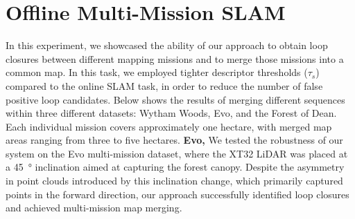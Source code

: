 \section{Offline Multi-Mission SLAM} 
\label{sec:offline_multi_mission}
In this experiment, we showcased the ability of our approach to obtain loop closures between different mapping missions and to merge those missions into a common map. In this task, we employed tighter descriptor thresholds ($\tau_{s}$) compared to the online SLAM task, in order to reduce the number of false positive loop candidates.
Below shows the results of merging different sequences within three different datasets: Wytham Woods, Evo, and the Forest of Dean. Each individual mission covers approximately one hectare, with merged map areas ranging from three to five hectares.
\newline
\textbf{Evo, }\hspace{0.5em} We tested the robustness of our system on the Evo multi-mission dataset, where the XT32 LiDAR was placed at a \SI{45}{\degree} inclination aimed at capturing the forest canopy. Despite the asymmetry in point clouds introduced by this inclination change, which primarily captured points in the forward direction, our approach successfully identified loop closures and achieved multi-mission map merging.
